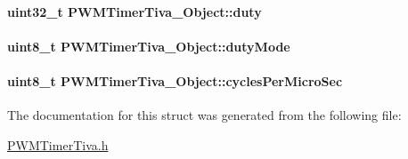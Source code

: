 \paragraph[{duty}]{\setlength{\rightskip}{0pt plus 5cm}uint32\+\_\+t P\+W\+M\+Timer\+Tiva\+\_\+\+Object\+::duty}\label{struct_p_w_m_timer_tiva___object_a7718c73a04571c4825fffd34c1029170}
\paragraph[{duty\+Mode}]{\setlength{\rightskip}{0pt plus 5cm}uint8\+\_\+t P\+W\+M\+Timer\+Tiva\+\_\+\+Object\+::duty\+Mode}\label{struct_p_w_m_timer_tiva___object_a518e2c1814f2a05da976b4e9da22143b}
\paragraph[{cycles\+Per\+Micro\+Sec}]{\setlength{\rightskip}{0pt plus 5cm}uint8\+\_\+t P\+W\+M\+Timer\+Tiva\+\_\+\+Object\+::cycles\+Per\+Micro\+Sec}\label{struct_p_w_m_timer_tiva___object_a91fd44574b6fdf1c845c61cf28569d9b}


The documentation for this struct was generated from the following file\+:\begin{DoxyCompactItemize}
\item 
\hyperlink{_p_w_m_timer_tiva_8h}{P\+W\+M\+Timer\+Tiva.\+h}\end{DoxyCompactItemize}
